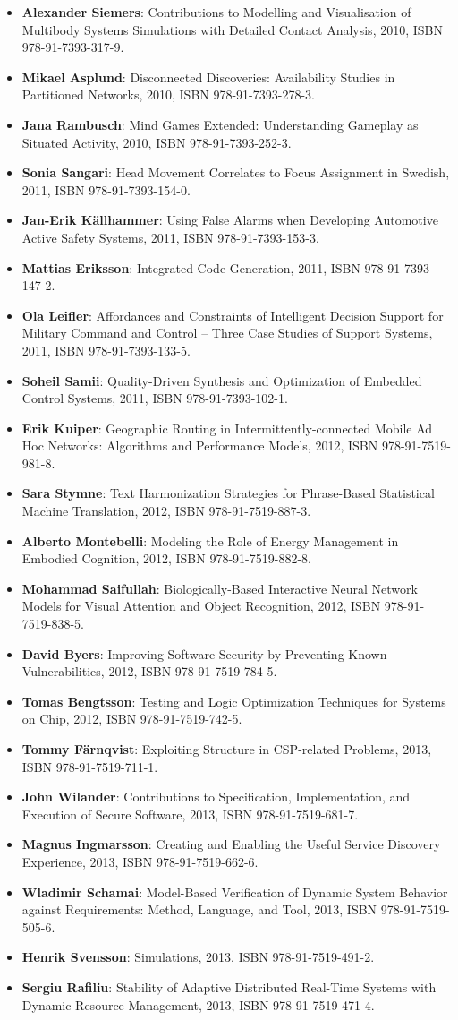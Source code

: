 \documentclass[a4paper,showtrims,twocolumn]{memoir}
\newenvironment{theses}
  {
    \begin{itemize}
      \setlength{\itemsep}{0.2em}
      \setlength{\parskip}{0em}
      \setlength{\parsep}{0em}
  }
  {
    \end{itemize}
  }
\newcommand{\thesis}[5]{\item[No. #1] \textbf{#2}: #3, #4, ISBN #5.}
\begin{document}
\begin{theses}
    \thesis{1337}{Alexander Siemers}{Contributions to Modelling and Visualisation of Multibody Systems Simulations with Detailed Contact Analysis}{2010}{978-91-7393-317-9}
    \thesis{1354}{Mikael Asplund}{Disconnected Discoveries: Availability Studies in Partitioned Networks}{2010}{978-91-7393-278-3}
    \thesis{1359}{Jana Rambusch}{Mind Games Extended: Understanding Gameplay as Situated Activity}{2010}{978-91-7393-252-3}
    \thesis{1373}{Sonia Sangari}{Head Movement Correlates to Focus Assignment in Swedish}{2011}{978-91-7393-154-0}
    \thesis{1374}{Jan-Erik Källhammer}{Using False Alarms when Developing Automotive Active Safety Systems}{2011}{978-91-7393-153-3}
    \thesis{1375}{Mattias Eriksson}{Integrated Code Generation}{2011}{978-91-7393-147-2}
    \thesis{1381}{Ola Leifler}{Affordances and Constraints of Intelligent Decision Support for Military Command and Control – Three Case Studies of Support Systems}{2011}{978-91-7393-133-5}
    \thesis{1386}{Soheil Samii}{Quality-Driven Synthesis and Optimization of Embedded Control Systems}{2011}{978-91-7393-102-1}
    \thesis{1419}{Erik Kuiper}{Geographic Routing in Intermittently-connected Mobile Ad Hoc Networks: Algorithms and Performance Models}{2012}{978-91-7519-981-8}
    \thesis{1451}{Sara Stymne}{Text Harmonization Strategies for Phrase-Based Statistical Machine Translation}{2012}{978-91-7519-887-3}
    \thesis{1455}{Alberto Montebelli}{Modeling the Role of Energy Management in Embodied Cognition}{2012}{978-91-7519-882-8}
    \thesis{1465}{Mohammad Saifullah}{Biologically-Based Interactive  Neural Network Models for Visual Attention and Object Recognition}{2012}{978-91-7519-838-5}
    \thesis{1481}{David Byers}{Improving Software Security by Preventing Known Vulnerabilities}{2012}{978-91-7519-784-5}
    \thesis{1490}{Tomas Bengtsson}{Testing and Logic Optimization Techniques for Systems on Chip}{2012}{978-91-7519-742-5}
    \thesis{1496}{Tommy Färnqvist}{Exploiting Structure in CSP-related Problems}{2013}{978-91-7519-711-1}
    \thesis{1503}{John Wilander}{Contributions to Specification, Implementation, and Execution of Secure Software}{2013}{978-91-7519-681-7}
    \thesis{1506}{Magnus Ingmarsson}{Creating and Enabling the Useful Service Discovery Experience}{2013}{978-91-7519-662-6}
    \thesis{1547}{Wladimir Schamai}{Model-Based Verification of Dynamic System Behavior against Requirements: Method, Language, and Tool}{2013}{978-91-7519-505-6}
    \thesis{1551}{Henrik Svensson}{Simulations}{2013}{978-91-7519-491-2}
    \thesis{1559}{Sergiu Rafiliu}{Stability of Adaptive Distributed Real-Time Systems with Dynamic Resource Management}{2013}{978-91-7519-471-4}

\end{theses}
\end{document}
